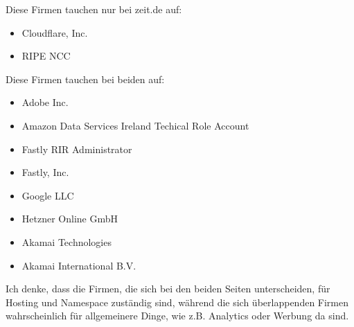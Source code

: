\documentclass{kdiartcl}
\begin{document}
Diese Firmen tauchen nur bei zeit.de auf:
\begin{itemize}
    \item Cloudflare, Inc.
    \item RIPE NCC
\end{itemize}

Diese Firmen tauchen bei beiden auf:
\begin{itemize}
    \item Adobe Inc.
    \item Amazon Data Services Ireland Techical Role Account
    \item Fastly RIR Administrator
    \item Fastly, Inc.
    \item Google LLC
    \item Hetzner Online GmbH
    \item Akamai Technologies
    \item Akamai International B.V.
\end{itemize}

Ich denke, dass die Firmen, die sich bei den beiden Seiten unterscheiden, für Hosting und Namespace zuständig sind, während die sich überlappenden Firmen wahrscheinlich für allgemeinere Dinge, wie z.B. Analytics oder Werbung da sind.
\end{document}
